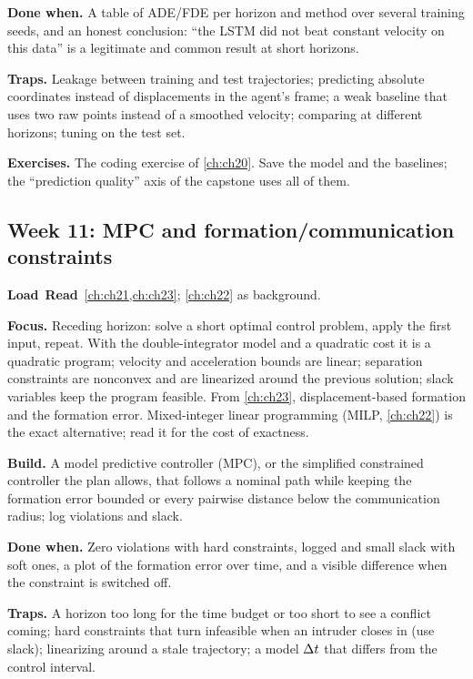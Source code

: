 \textbf{Done when.} A table of ADE/FDE per horizon and method over several training seeds,
and an honest conclusion: ``the LSTM did not beat constant velocity on this data'' is a
legitimate and common result at short horizons.

\textbf{Traps.} Leakage between training and test trajectories; predicting absolute
coordinates instead of displacements in the agent's frame; a weak baseline that uses two raw
points instead of a smoothed velocity; comparing at different horizons; tuning on the test
set.

\textbf{Exercises.} The coding exercise of \cref{ch:ch20}. Save the model and the
baselines; the ``prediction quality'' axis of the capstone uses all of them.

\subsection{Week 11: MPC and formation/communication constraints}
\label{sec:appA-week11}
\noindent\textbf{Load}\ \quad\textbf{Read}\ \cref{ch:ch21,ch:ch23};
\cref{ch:ch22} as background.

\textbf{Focus.} Receding horizon: solve a short optimal control problem, apply the first
input, repeat. With the double-integrator model and a quadratic cost it is a quadratic
program; velocity and acceleration bounds are linear; separation constraints are nonconvex
and are linearized around the previous solution; slack variables keep the program feasible.
From \cref{ch:ch23}, displacement-based formation and the formation error. Mixed-integer
linear programming (MILP, \cref{ch:ch22}) is the exact alternative; read it for the cost of
exactness.

\textbf{Build.} A model predictive controller (MPC), or the simplified constrained
controller the plan allows, that follows a nominal path while keeping the formation error
bounded or every pairwise distance below the communication radius; log violations and slack.

\textbf{Done when.} Zero violations with hard constraints, logged and small slack with soft
ones, a plot of the formation error over time, and a visible difference when the constraint
is switched off.

\textbf{Traps.} A horizon too long for the time budget or too short to see a conflict
coming; hard constraints that turn infeasible when an intruder closes in (use slack);
linearizing around a stale trajectory; a model $\Delta t$ that differs from the control interval.

